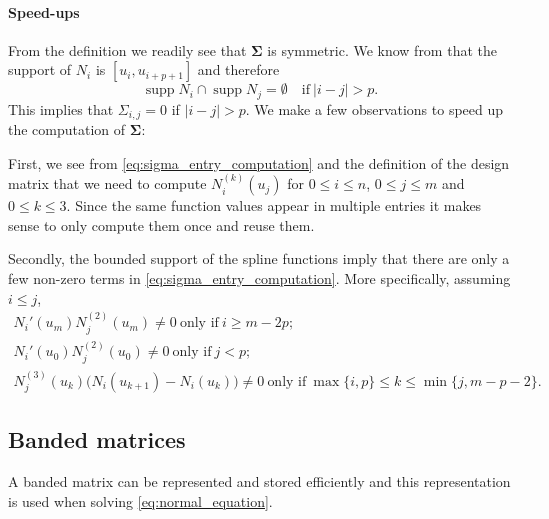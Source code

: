\documentclass[a4paper]{scrartcl}
\newcommand{\mat}[1]{\ensuremath{\bm{#1}}}
\DeclareMathOperator\supp{supp}
\begin{document}
\paragraph{Speed-ups}

From the definition we readily see that $\mat\Sigma$ is symmetric.
We know from \cite[P2.1]{Piegl:Tiller:1997} that the support of $N_i$ is $[u_i, u_{i+p+1}]$ and therefore 
\begin{equation*}
    \supp N_i \cap \supp N_j = \emptyset
    \quad\text{if}\:
    |i - j| > p.
\end{equation*}
This implies that $\Sigma_{i,j} = 0$ if $|i - j| > p$.
We make a few observations to speed up the computation of $\mat\Sigma$:

First, we see from \cref{eq:sigma_entry_computation} and the definition of the design matrix that we need to compute $N_i^{(k)}(u_j)$ for $0\leq i\leq n$, $0\leq j\leq m$ and $0\leq k\leq 3$.
Since the same function values appear in multiple entries it makes sense to only compute them once and reuse them.

Secondly, the bounded support of the spline functions imply that there are only a few non-zero terms in \cref{eq:sigma_entry_computation}.
More specifically, assuming $i\leq j$,
\begin{gather*}
    N_i'(u_m) N_j^{(2)}(u_m) \neq 0
    \ \text{only if}\  i \geq m - 2p;
    \\
    N_i'(u_0) N_j^{(2)}(u_0) \neq 0
    \ \text{only if}\ j < p;
     \\
    N_j^{(3)}(u_k) \bigl(N_i(u_{k+1}) - N_i(u_k)\bigr) \neq 0
    \ \text{only if}\ \max\{i, p\} \leq k\leq \min\{j, m - p - 2\}.
\end{gather*}

\subsection{Banded matrices}

A banded matrix can be represented and stored efficiently \cite[Section 1.2.5]{Golub:van_Loan:2013} and this representation is used when solving \cref{eq:normal_equation}.


\printbibliography
\end{document}
